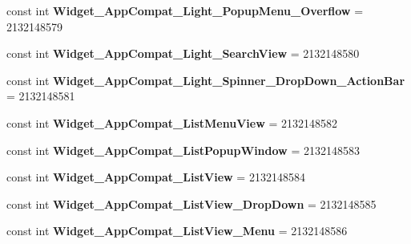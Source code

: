 \begin{DoxyCompactItemize}
\item 
\mbox{\label{classst_delivery_1_1_resource_1_1_style_a936ec177d83d4a26da85792cdc3f4325}} 
const int {\bfseries Widget\+\_\+\+App\+Compat\+\_\+\+Light\+\_\+\+Popup\+Menu\+\_\+\+Overflow} = 2132148579
\item 
\mbox{\label{classst_delivery_1_1_resource_1_1_style_a2a643470f51ed1271b9e14f62c8cf335}} 
const int {\bfseries Widget\+\_\+\+App\+Compat\+\_\+\+Light\+\_\+\+Search\+View} = 2132148580
\item 
\mbox{\label{classst_delivery_1_1_resource_1_1_style_a44d546d2b6d80bf6edf6c2d3a1b7e50f}} 
const int {\bfseries Widget\+\_\+\+App\+Compat\+\_\+\+Light\+\_\+\+Spinner\+\_\+\+Drop\+Down\+\_\+\+Action\+Bar} = 2132148581
\item 
\mbox{\label{classst_delivery_1_1_resource_1_1_style_a8bc6f26af07528eb73d7510fa8f93785}} 
const int {\bfseries Widget\+\_\+\+App\+Compat\+\_\+\+List\+Menu\+View} = 2132148582
\item 
\mbox{\label{classst_delivery_1_1_resource_1_1_style_a4a959d5c86078affa85114c185f17cc2}} 
const int {\bfseries Widget\+\_\+\+App\+Compat\+\_\+\+List\+Popup\+Window} = 2132148583
\item 
\mbox{\label{classst_delivery_1_1_resource_1_1_style_a317a4337b955b2a094f7e453d183c3c4}} 
const int {\bfseries Widget\+\_\+\+App\+Compat\+\_\+\+List\+View} = 2132148584
\item 
\mbox{\label{classst_delivery_1_1_resource_1_1_style_a8e4ac3b20a7a7f859babc617528ab438}} 
const int {\bfseries Widget\+\_\+\+App\+Compat\+\_\+\+List\+View\+\_\+\+Drop\+Down} = 2132148585
\item 
\mbox{\label{classst_delivery_1_1_resource_1_1_style_ad94ef2d9e940d91deac6278e2d3eae54}} 
const int {\bfseries Widget\+\_\+\+App\+Compat\+\_\+\+List\+View\+\_\+\+Menu} = 2132148586
\item 

\end{DoxyCompactItemize}
